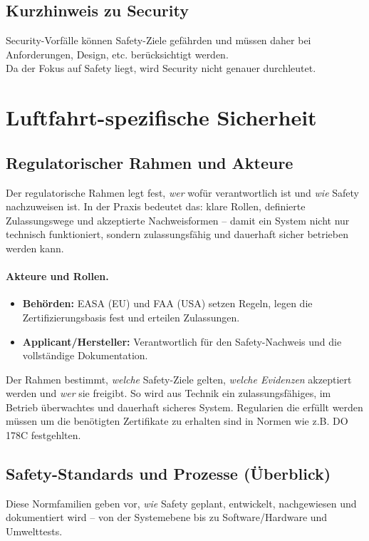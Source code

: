 \subsection{Kurzhinweis zu Security}
Security-Vorfälle können Safety-Ziele gefährden und müssen daher bei Anforderungen, Design, etc. berücksichtigt werden. \\
Da der Fokus auf Safety liegt, wird Security nicht genauer durchleutet.


\section{Luftfahrt-spezifische Sicherheit}

\subsection{Regulatorischer Rahmen und Akteure}
Der regulatorische Rahmen legt fest, \emph{wer} wofür verantwortlich ist und \emph{wie} Safety nachzuweisen ist. 
In der Praxis bedeutet das: klare Rollen, definierte Zulassungswege und akzeptierte Nachweisformen – damit ein System nicht nur technisch funktioniert, sondern zulassungsfähig und dauerhaft sicher betrieben werden kann.

\paragraph{Akteure und Rollen.}
\begin{itemize}
  \item \textbf{Behörden:} EASA (EU) und FAA (USA) setzen Regeln, legen die Zertifizierungsbasis fest und erteilen Zulassungen.
  \item \textbf{Applicant/Hersteller:} Verantwortlich für den Safety-Nachweis und die vollständige Dokumentation.
\end{itemize}

Der Rahmen bestimmt, \emph{welche} Safety-Ziele gelten, \emph{welche Evidenzen} akzeptiert werden und \emph{wer} sie freigibt. 
So wird aus Technik ein zulassungsfähiges, im Betrieb überwachtes und dauerhaft sicheres System.
Regularien die erfüllt werden müssen um die benötigten Zertifikate zu erhalten sind in Normen wie z.B. DO 178C festgehlten.

\subsection{Safety-Standards und Prozesse (Überblick)}
Diese Normfamilien geben vor, \emph{wie} Safety geplant, entwickelt, nachgewiesen und dokumentiert wird – von der Systemebene bis zu Software/Hardware und Umwelttests.

